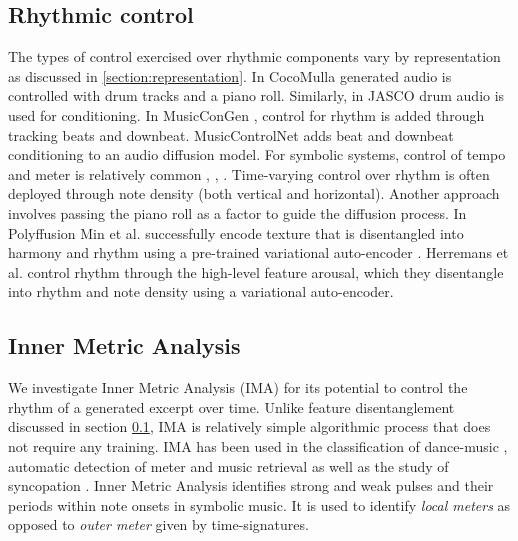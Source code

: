 \subsection{Rhythmic control} \label{section:rhytmic_weight}
The types of control exercised over rhythmic components vary by representation as discussed in \ref{section:representation}. In CocoMulla \cite{Lin_cocomulla_2024} generated audio is controlled with drum tracks and a piano roll. Similarly, in JASCO\cite{Tal_jasco} drum audio is used for conditioning. In MusicConGen \cite{Lan_Hsiao_Cheng_Yang_musicongen_2024}, control for rhythm is added through tracking beats and downbeat. MusicControlNet \cite{Wu_Donahue_musicontrolnet_2023} adds beat and downbeat conditioning to an audio diffusion model.
For symbolic systems, control of tempo and meter is relatively common \cite{Rütte_figaro_2023}, \cite{Huang_Yang_remi_pop_transformer_2020}, \cite{Lu_Xu_Kang_Yu_Xing_Tan_Bian_MuseCoco_2023}. Time-varying control over rhythm is often deployed through note density (both vertical and horizontal)\cite{Rütte_figaro_2023}\cite{Huang_rule_diffusion_2024}. Another approach \cite{Zhu_Liu_Jiang_Zheng_texture_2024} involves passing the piano roll as a factor to guide the diffusion process. In Polyffusion \cite{Min_Jiang_Xia_Zhao_polyffusion_2023} Min et al. successfully encode texture that is disentangled into harmony and rhythm using a pre-trained variational auto-encoder \cite{Wang_vae_chord_rhythm_2020}. Herremans et al. \cite{Tan_Herremans_2020} control rhythm through the high-level feature arousal, which they disentangle into rhythm and note density using a variational auto-encoder. 

\subsection{Inner Metric Analysis} \label{section:ima}
We investigate Inner Metric Analysis (IMA) for its potential to control the rhythm of a generated excerpt over time. Unlike feature disentanglement discussed in section \ref{section:rhytmic_weight}, IMA is relatively simple algorithmic process that does not require any training. IMA has been used in the classification of dance-music \cite{Chew_Volk_Lee_Dance_metric_weight_2005}, automatic detection of meter \cite{Haas_Volk_2016} and music retrieval \cite{Volk_Garbers_VanKranenburg_Wiering_Grijp_Veltkamp_2009} as well as the study of syncopation \cite{Bemman2024}\cite{Volk2008Syncopation}.
Inner Metric Analysis identifies strong and weak pulses and their periods within note onsets in symbolic music. It is used to identify \textit{local meters} as opposed to \textit{outer meter} given by time-signatures.

